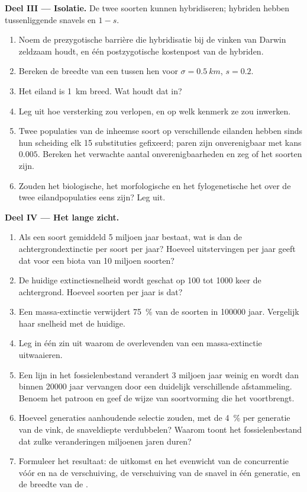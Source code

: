 \begin{problem}
\medskip
\noindent\textbf{Deel III --- Isolatie.}
De twee soorten kunnen hybridiseren; hybriden hebben tussenliggende snavels en
 $1 - s$.
\begin{enumerate}[resume]
  \item Noem de prezygotische barrière die hybridisatie bij de vinken van
        Darwin zeldzaam houdt, en één postzygotische kostenpost van de
        hybriden.
  \item Bereken de breedte van een  tussen hen voor $\sigma
        = \qty{0.5}{km}$, $s = 0.2$.
  \item Het eiland is \qty{1}{km} breed. Wat houdt dat in?
  \item Leg uit hoe versterking zou verlopen, en op welk kenmerk
        ze zou inwerken.
  \item Twee populaties van de inheemse soort op verschillende eilanden hebben
        sinds hun scheiding elk 15 substituties gefixeerd; paren zijn
        onverenigbaar met kans $0.005$. Bereken het verwachte aantal
        onverenigbaarheden en zeg of het soorten zijn.
  \item Zouden het biologische, het morfologische en het fylogenetische
         het over de twee eilandpopulaties eens zijn? Leg uit.
\end{enumerate}

\medskip
\noindent\textbf{Deel IV --- Het lange zicht.}
\begin{enumerate}[resume]
  \item Als een soort gemiddeld 5 miljoen jaar bestaat, wat is dan de
        achtergrondextinctie per soort per jaar? Hoeveel uitstervingen per
        jaar geeft dat voor een biota van 10 miljoen soorten?
  \item De huidige extinctiesnelheid wordt geschat op 100 tot 1000
        keer de achtergrond. Hoeveel soorten per jaar is dat?
  \item Een massa-extinctie verwijdert \qty{75}{\%} van de soorten in
        \num{100000} jaar. Vergelijk haar snelheid met de huidige.
  \item Leg in één zin uit waarom de overlevenden van een
        massa-extinctie uitwaaieren.
  \item Een lijn in het fossielenbestand verandert 3 miljoen jaar weinig
        en wordt dan binnen \num{20000} jaar vervangen door een duidelijk
        verschillende afstammeling. Benoem het patroon en geef de wijze van
        soortvorming die het voortbrengt.
  \item Hoeveel generaties aanhoudende selectie zouden, met de
        \qty{4}{\%} per generatie van de vink, de snaveldiepte verdubbelen?
        Waarom toont het fossielenbestand dat zulke veranderingen miljoenen
        jaren duren?
  \item Formuleer het resultaat: de uitkomst en het evenwicht van de
        concurrentie vóór en na de verschuiving, de verschuiving van de snavel
        in één generatie, en de breedte van de .
\end{enumerate}
\end{problem}
